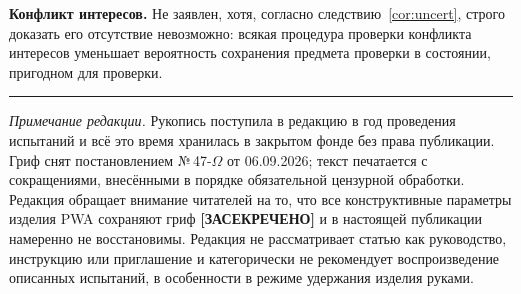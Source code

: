\documentclass[11pt,a4paper]{article}
\newcommand{\SEC}{\textbf{[ЗАСЕКРЕЧЕНО]}}
\begin{document}
\noindent\textbf{Конфликт интересов.} Не заявлен, хотя, согласно следствию~\ref{cor:uncert}, строго доказать его отсутствие невозможно: всякая процедура проверки конфликта интересов уменьшает вероятность сохранения предмета проверки в состоянии, пригодном для проверки.

\bigskip
\noindent\hrule
\smallskip
\noindent\footnotesize\emph{Примечание редакции.} Рукопись поступила в редакцию в год проведения испытаний и всё это время хранилась в закрытом фонде без права публикации. Гриф снят постановлением №\,47-$\Omega$ от 06.09.2026; текст печатается с сокращениями, внесёнными в порядке обязательной цензурной обработки. Редакция обращает внимание читателей на то, что все конструктивные параметры изделия PWA сохраняют гриф \SEC{} и в настоящей публикации намеренно не восстановимы. Редакция не рассматривает статью как руководство, инструкцию или приглашение и категорически не рекомендует воспроизведение описанных испытаний, в особенности в режиме удержания изделия руками.
\end{document}
